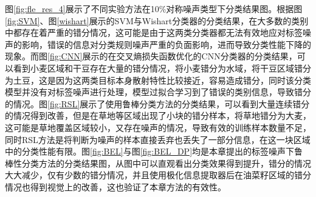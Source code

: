 图\ref{fig:fle_res_4}展示了不同实验方法在10\%对称噪声类型下分类结果图。根据图\ref{fig:SVM}、图\ref{wishart}展示的SVM与Wishart分类器的分类结果，在大多数的类别中都存在着严重的错分情况，这可能是由于这两类分类器都无法有效地应对标签噪声的影响，错误的信息对分类规则噪声严重的负面影响，进而导致分类性能下降的现象。而图\ref{fig:CNN}展示的在交叉熵损失函数优化的CNN分类器的分类结果，可以看到小麦区域和干豆存在大量的错分情况，将小麦错分为水域，将干豆区域错分为土豆，这是因为这两类目标本身散射特性比较接近，容易造成错分，同时该分类模型并没有对标签噪声进行处理，模型过拟合学习到了错误的类别信息，导致错分的情况。图\ref{fig:RSL}展示了使用鲁棒分类方法的分类结果，可以看到大量连续错分的情况得到改善，但是在草地等区域出现了小块的错分样本，将草地错分为大麦，这可能是草地覆盖区域较小，又存在噪声的情况，导致有效的训练样本数量不足，同时RSL方法是将判断为噪声的样本直接丢弃也丢失了一部分信息，在这一块区域中的分类性能有限。图\ref{fig:BEL}与图\ref{fig:BEL_DP}均是本章提出的标签噪声下鲁棒性分类方法的分类结果图，从图中可以直观看出分类效果得到提升，错分的情况大大减少，仅有少数的错分情况，并且使用极化信息提取器后在油菜籽区域的错分情况也得到视觉上的改善，这也验证了本章方法的有效性。

